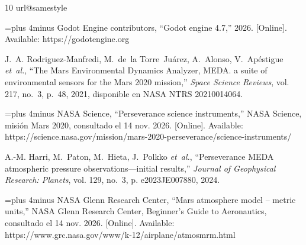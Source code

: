\documentclass[conference]{IEEEtran}
\begin{document}
\begin{thebibliography}{10}
\providecommand{\url}[1]{#1}
\csname url@samestyle\endcsname
\providecommand{\newblock}{\relax}
\providecommand{\bibinfo}[2]{#2}
\providecommand{\BIBentrySTDinterwordspacing}{\spaceskip=0pt\relax}
\providecommand{\BIBentryALTinterwordstretchfactor}{4}
\providecommand{\BIBentryALTinterwordspacing}{\spaceskip=\fontdimen2\font plus
\BIBentryALTinterwordstretchfactor\fontdimen3\font minus
  \fontdimen4\font\relax}
\providecommand{\BIBforeignlanguage}[2]{{%
\expandafter\ifx\csname l@#1\endcsname\relax
\typeout{** WARNING: IEEEtran.bst: No hyphenation pattern has been}%
\typeout{** loaded for the language `#1'. Using the pattern for}%
\typeout{** the default language instead.}%
\else
\language=\csname l@#1\endcsname
\fi
#2}}
\providecommand{\BIBdecl}{\relax}
\BIBdecl

\BIBentryALTinterwordspacing
{Godot Engine contributors}, ``Godot engine 4.7,'' 2026. [Online]. Available:
  \url{https://godotengine.org}
\BIBentrySTDinterwordspacing

J.~A. Rodriguez-Manfredi, M.~de~la Torre~Ju{\'a}rez, A.~Alonso,
  V.~Ap{\'e}stigue \emph{et~al.}, ``The {Mars Environmental Dynamics Analyzer,
  MEDA}. a suite of environmental sensors for the {Mars 2020} mission,''
  \emph{Space Science Reviews}, vol. 217, no.~3, p.~48, 2021, disponible en
  NASA NTRS 20210014064.

\BIBentryALTinterwordspacing
{NASA Science}, ``{Perseverance} science instruments,'' NASA Science,
  misi{\'o}n Mars 2020, consultado el 14 nov. 2026. [Online]. Available:
  \url{https://science.nasa.gov/mission/mars-2020-perseverance/science-instruments/}
\BIBentrySTDinterwordspacing

A.-M. Harri, M.~Paton, M.~Hieta, J.~Polkko \emph{et~al.}, ``Perseverance {MEDA}
  atmospheric pressure observations---initial results,'' \emph{Journal of
  Geophysical Research: Planets}, vol. 129, no.~3, p. e2023JE007880, 2024.

\BIBentryALTinterwordspacing
{NASA Glenn Research Center}, ``Mars atmosphere model -- metric units,'' NASA
  Glenn Research Center, Beginner's Guide to Aeronautics, consultado el 14 nov.
  2026. [Online]. Available:
  \url{https://www.grc.nasa.gov/www/k-12/airplane/atmosmrm.html}
\BIBentrySTDinterwordspacing


\end{thebibliography}
\end{document}
